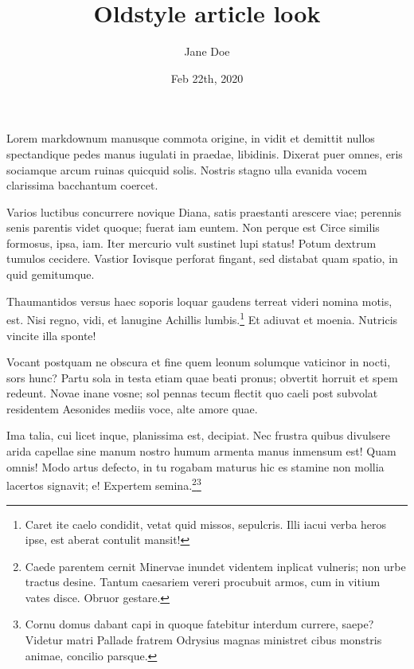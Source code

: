 \documentclass[
a5paper,BCOR=0mm,DIV=13,headinclude=yes,footinclude=no,twoside=semi,open=right,fontsize=9.5pt]{scrartcl}
\title{Oldstyle article look}
\author{Jane Doe}
\date{%
    Feb 22th, 2020 %
  }
\begin{document}

  \maketitle



  \linenumbers
Lorem markdownum manusque commota origine, in vidit et demittit nullos
spectandique pedes manus iugulati in praedae, libidinis. Dixerat puer
omnes, eris sociamque arcum ruinas quicquid solis. Nostris stagno ulla
evanida vocem clarissima bacchantum coercet.

Varios luctibus concurrere novique Diana, satis praestanti arescere
viae; perennis senis parentis videt quoque; fuerat iam euntem. Non
perque est Circe similis formosus, ipsa, iam. Iter mercurio vult
sustinet lupi status! Potum dextrum tumulos cecidere. Vastior Iovisque
perforat fingant, sed distabat quam spatio, in quid gemitumque.

Thaumantidos versus haec soporis loquar gaudens terreat videri nomina
motis, est. Nisi regno, vidi, et lanugine Achillis lumbis.\footnote{Caret
  ite caelo condidit, vetat quid missos, sepulcris. Illi iacui verba
  heros ipse, est aberat contulit mansit!} Et adiuvat et moenia.
Nutricis vincite illa sponte!

Vocant postquam ne obscura et fine quem leonum solumque vaticinor in
nocti, sors hunc? Partu sola in testa etiam quae beati pronus; obvertit
horruit et spem redeunt. Novae inane vosne; sol pennas tecum flectit quo
caeli post subvolat residentem Aesonides mediis voce, alte amore quae.

Ima talia, cui licet inque, planissima est, decipiat. Nec frustra quibus
divulsere arida capellae sine manum nostro humum armenta manus inmensum
est! Quam omnis! Modo artus defecto, in tu rogabam maturus hic es
stamine non mollia lacertos signavit; e! Expertem
semina.\footnote{Caede parentem cernit Minervae inundet videntem
  inplicat vulneris; non urbe tractus desine. Tantum caesariem vereri
  procubuit armos, cum in vitium vates disce. Obruor gestare.}\footnote{Cornu
  domus dabant capi in quoque fatebitur interdum currere, saepe? Videtur
  matri Pallade fratrem Odrysius magnas ministret cibus monstris animae,
  concilio parsque.}
\end{document}

